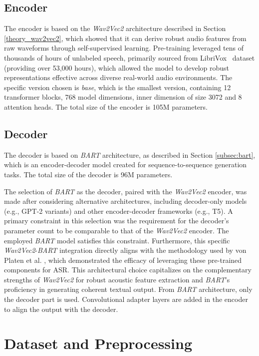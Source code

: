 \subsection{Encoder}
The encoder is based on the \textit{Wav2Vec2} architecture described in Section \ref{theory_wav2vec2}, which showed that it can derive robust audio features from raw waveforms through self-supervised learning. Pre-training leveraged tens of thousands of hours of unlabeled speech, primarily sourced from LibriVox~\cite{Kahn_2020} dataset (providing over 53,000 hours), which allowed the model to develop robust representations effective across diverse real-world audio environments. The specific version chosen is \textit{base}, which is the smallest version, containing 12 transformer blocks, 768 model dimensions, inner dimension of size 3072 and 8 attention heads. The total size of the encoder is 105M parameters. 

\subsection{Decoder}
The decoder is based on \textit{BART} architecture, as described in Section \ref{subsec:bart}, which is an encoder-decoder model created for sequence-to-sequence generation tasks. The total size of the decoder is 96M parameters. 

The selection of \textit{BART} as the decoder, paired with the \textit{Wav2Vec2} encoder, was made after considering alternative architectures, including decoder-only models (e.g., GPT-2 variants) and other encoder-decoder frameworks (e.g., T5). A primary constraint in this selection was the requirement for the decoder's parameter count to be comparable to that of the \textit{Wav2Vec2} encoder. The employed \textit{BART} model satisfies this constraint. Furthermore, this specific \textit{Wav2Vec2}-\textit{BART} integration directly aligns with the methodology used by von Platen et  al. \cite{vonPlaten2020warmstart}, which demonstrated the efficacy of leveraging these pre-trained components for ASR. This architectural choice capitalizes on the complementary strengths of \textit{Wav2Vec2} for robust acoustic feature extraction and \textit{BART}'s proficiency in generating coherent textual output.
From \textit{BART} architecture, only the decoder part is used. Convolutional adapter layers are added in the encoder to align the output with the decoder. 

\section{Dataset and Preprocessing}\label{sec:dataset_preprocessing_exp}

